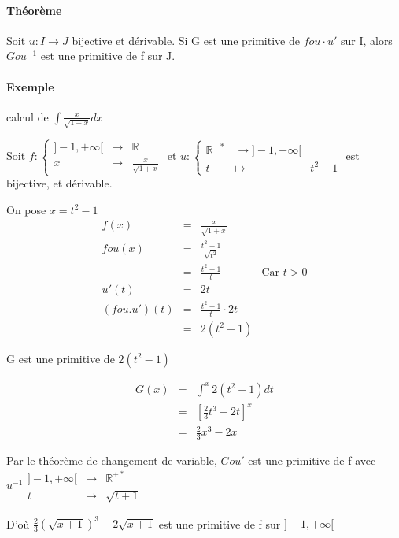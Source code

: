 \paragraph{Théorème} Soit $u:I \rightarrow J$ bijective et dérivable. Si G est une primitive de $fou\cdot u'$ sur I, alors $Gou^{-1}$ est une primitive de f sur J.

\paragraph{Exemple} calcul de $\int\frac{x}{\sqrt{1+x}}dx$

Soit $f:\left\{\begin{array}{rcl}
 ]-1, +\infty[ &\rightarrow& \mathbb{R} \\
x &\mapsto& \frac{x}{\sqrt{1+x}}\end{array}\right.$
		et $u : \left\{\begin{array}{rcl}
\mathbb{R}^{+*} & \rightarrow ]-1, +\infty[ \\
t &\mapsto& t^2 -1\end{array}\right.$ est bijective, et dérivable.

On pose $x = t^2 - 1$ \[\begin{array}{rclr}
	f(x) &=& \frac{x}{\sqrt{1+x}} \\
	fou(x) &=& \frac{t^2 - 1}{\sqrt{t^2}} \\
		&=& \frac{t^2 - 1}{t} & \text{Car } t > 0 \\
	u'(t) &=& 2t \\
(fou.u')(t) &=& \frac{t^2 -1}{t}\cdot 2t \\
			&=& 2(t^2-1)
\end{array}\]

G est une primitive de $2(t^2 - 1)$ 

\[\begin{array}{rcl}
	G(x) &=& \int^x 2(t^2-1)dt \\
&=& [\frac{2}{3}t^3 - 2t]^x \\
&=& \frac{2}{3}x^3 - 2x\end{array}\]

Par le théorème de changement de variable, $Gou'$ est une primitive de f avec $u^{-1} \begin{array}{rcl}
																						]-1, +\infty[ &\rightarrow& \mathbb{R}^{+*} \\
																									t &\mapsto& \sqrt{t+1}\end{array}$

D'où $\frac{2}{3}(\sqrt{x+1})^3 - 2\sqrt{x+1}$ est une primitive de f sur $]-1, +\infty[$

